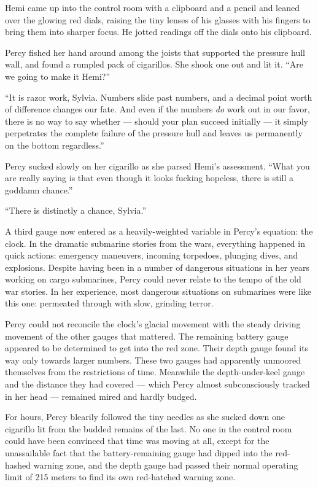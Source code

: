 \documentclass[
]{scrbook}
\begin{document}
Hemi came up into the control room with a clipboard and a pencil and
leaned over the glowing red dials, raising the tiny lenses of his
glasses with his fingers to bring them into sharper focus. He jotted
readings off the dials onto his clipboard.

Percy fished her hand around among the joists that supported the
pressure hull wall, and found a rumpled pack of cigarillos. She shook
one out and lit it. ``Are we going to make it Hemi?''

``It is razor work, Sylvia. Numbers slide past numbers, and a decimal
point worth of difference changes our fate. And even if the numbers
\emph{do} work out in our favor, there is no way to say whether ---
should your plan succeed initially --- it simply perpetrates the
complete failure of the pressure hull and leaves us permanently on the
bottom regardless.''

Percy sucked slowly on her cigarillo as she parsed Hemi's assessment.
``What you are really saying is that even though it looks fucking
hopeless, there is still a goddamn chance.''

``There is distinctly a chance, Sylvia.''

A third gauge now entered as a heavily-weighted variable in Percy's
equation: the clock. In the dramatic submarine stories from the wars,
everything happened in quick actions: emergency maneuvers, incoming
torpedoes, plunging dives, and explosions. Despite having been in a
number of dangerous situations in her years working on cargo submarines,
Percy could never relate to the tempo of the old war stories. In her
experience, most dangerous situations on submarines were like this one:
permeated through with slow, grinding terror.

Percy could not reconcile the clock's glacial movement with the steady
driving movement of the other gauges that mattered. The remaining
battery gauge appeared to be determined to get into the red zone. Their
depth gauge found its way only towards larger numbers. These two gauges
had apparently unmoored themselves from the restrictions of time.
Meanwhile the depth-under-keel gauge and the distance they had covered
--- which Percy almost subconsciously tracked in her head --- remained
mired and hardly budged.

For hours, Percy blearily followed the tiny needles as she sucked down
one cigarillo lit from the budded remains of the last. No one in the
control room could have been convinced that time was moving at all,
except for the unassailable fact that the battery-remaining gauge had
dipped into the red-hashed warning zone, and the depth gauge had passed
their normal operating limit of 215 meters to find its own red-hatched
warning zone.
\end{document}
